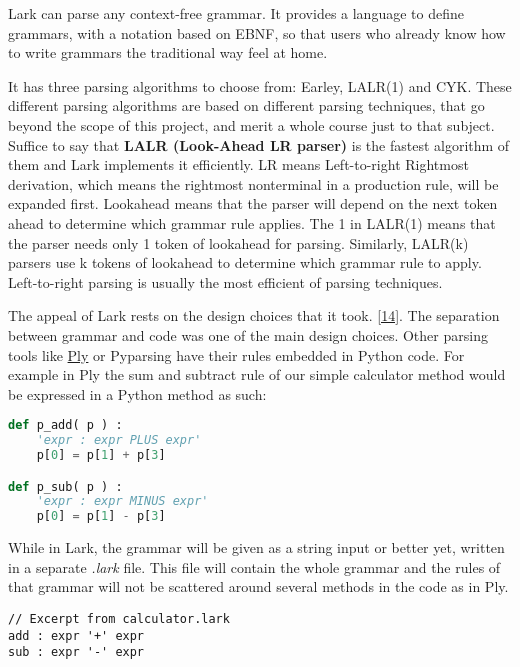 \documentclass[12pt]{article}
\begin{document}
Lark can parse any context-free grammar. It provides a language to define grammars, with a notation based on EBNF, so that users who already know how to write grammars the traditional way feel at home. 

It has three parsing algorithms to choose from: Earley, LALR(1) and CYK. These different parsing algorithms are based on different parsing techniques, that go beyond the scope of this project, and merit a whole course just to that subject. Suffice to say that \textbf{LALR (Look-Ahead LR parser)} is the fastest algorithm of them and Lark implements it efficiently. LR means Left-to-right Rightmost derivation, which means the rightmost nonterminal in a production rule, will be expanded first. Lookahead means that the parser will depend on the next token ahead to determine which grammar rule applies. The 1 in LALR(1) means that the parser needs only 1 token of lookahead for parsing. Similarly, LALR(k) parsers use k tokens of lookahead to determine which grammar rule to apply. Left-to-right parsing is usually the most efficient of parsing techniques. 

The appeal of Lark rests on the design choices that it took. \href{https://lark-parser.readthedocs.io/en/latest/philosophy/}{[14]}. The separation between grammar and code was one of the main design choices. Other parsing tools like \href{https://github.com/dabeaz/ply}{Ply} or Pyparsing have their rules embedded in Python code. For example in Ply the sum and subtract rule of our simple calculator method would be expressed in a Python method as such:
\begin{lstlisting}[language=Python]
def p_add( p ) :
    'expr : expr PLUS expr'
    p[0] = p[1] + p[3]

def p_sub( p ) :
    'expr : expr MINUS expr'
    p[0] = p[1] - p[3]
\end{lstlisting}

While in Lark, the grammar will be given as a string input or better yet, written in a separate \emph{.lark} file. This file will contain the whole grammar and the rules of that grammar will not be scattered around several methods in the code as in Ply.

\begin{lstlisting}
// Excerpt from calculator.lark
add : expr '+' expr
sub : expr '-' expr
\end{lstlisting}
\end{document}
